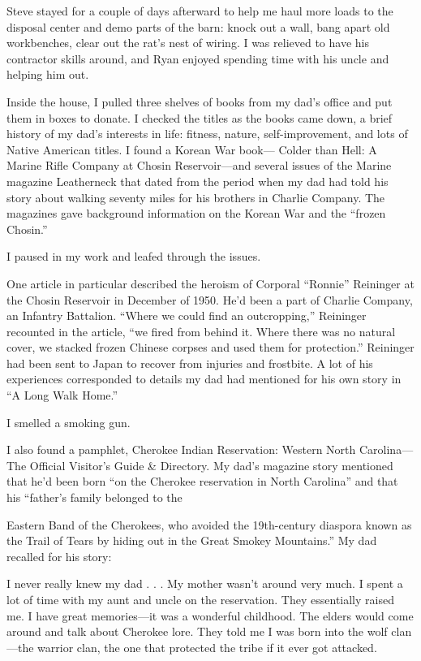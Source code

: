 \documentclass[12pt]{book}
\begin{document}
Steve stayed for a couple of days afterward to help me haul more loads to the disposal center and demo parts of the barn: knock out a wall, bang apart old workbenches, clear out the rat's nest of wiring. I was relieved to have his contractor skills around, and Ryan enjoyed spending time with his uncle and helping him out.

Inside the house, I pulled three shelves of books from my dad's office and put them in boxes to donate. I checked the titles as the books came down, a brief history of my dad's interests in life: fitness, nature, self-improvement, and lots of Native American titles. I found a Korean War book--- Colder than Hell: A Marine Rifle Company at Chosin Reservoir---and several issues of the Marine magazine Leatherneck that dated from the period when my dad had told his story about walking seventy miles for his brothers in Charlie Company. The magazines gave background information on the Korean War and the ``frozen Chosin.''

I paused in my work and leafed through the issues.

One article in particular described the heroism of Corporal ``Ronnie'' Reininger at the Chosin Reservoir in December of 1950. He'd been a part of Charlie Company, an Infantry Battalion. ``Where we could find an outcropping,'' Reininger recounted in the article, ``we fired from behind it. Where there was no natural cover, we stacked frozen Chinese corpses and used them for protection.'' Reininger had been sent to Japan to recover from injuries and frostbite. A lot of his experiences corresponded to details my dad had mentioned for his own story in ``A Long Walk Home.''

I smelled a smoking gun.

I also found a pamphlet, Cherokee Indian Reservation: Western North Carolina--- The Official Visitor's Guide \& Directory. My dad's magazine story mentioned that he'd been born ``on the Cherokee reservation in North Carolina'' and that his ``father's family belonged to the

Eastern Band of the Cherokees, who avoided the 19th-century diaspora known as the Trail of Tears by hiding out in the Great Smokey Mountains.'' My dad recalled for his story:

I never really knew my dad . . . My mother wasn't around very much. I spent a lot of time with my aunt and uncle on the reservation. They essentially raised me. I have great memories---it was a wonderful childhood. The elders would come around and talk about Cherokee lore. They told me I was born into the wolf clan ---the warrior clan, the one that protected the tribe if it ever got attacked.
\end{document}
